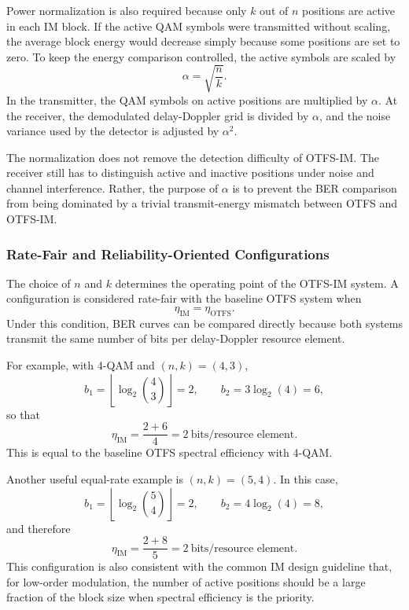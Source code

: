 Power normalization is also required because only \(k\) out of \(n\) positions are active in each IM block. If the active QAM symbols were transmitted without scaling, the average block energy would decrease simply because some positions are set to zero. To keep the energy comparison controlled, the active symbols are scaled by
\begin{equation}
    \alpha = \sqrt{\frac{n}{k}}.
    \label{eq:otfs_im_alpha}
\end{equation}
In the transmitter, the QAM symbols on active positions are multiplied by \(\alpha\). At the receiver, the demodulated delay-Doppler grid is divided by \(\alpha\), and the noise variance used by the detector is adjusted by \(\alpha^2\).

The normalization does not remove the detection difficulty of OTFS-IM. The receiver still has to distinguish active and inactive positions under noise and channel interference. Rather, the purpose of \(\alpha\) is to prevent the BER comparison from being dominated by a trivial transmit-energy mismatch between OTFS and OTFS-IM.

\subsubsection{Rate-Fair and Reliability-Oriented Configurations}

The choice of \(n\) and \(k\) determines the operating point of the OTFS-IM system. A configuration is considered rate-fair with the baseline OTFS system when
\begin{equation}
    \eta_{\mathrm{IM}} = \eta_{\mathrm{OTFS}}.
\end{equation}
Under this condition, BER curves can be compared directly because both systems transmit the same number of bits per delay-Doppler resource element.

For example, with 4-QAM and \((n,k)=(4,3)\),
\begin{equation}
    b_1 = \left\lfloor \log_2 \binom{4}{3} \right\rfloor = 2,
    \qquad
    b_2 = 3\log_2(4)=6,
\end{equation}
so that
\begin{equation}
    \eta_{\mathrm{IM}} = \frac{2+6}{4}=2
    \ \text{bits/resource element}.
\end{equation}
This is equal to the baseline OTFS spectral efficiency with 4-QAM.

Another useful equal-rate example is \((n,k)=(5,4)\). In this case,
\begin{equation}
    b_1 = \left\lfloor \log_2 \binom{5}{4} \right\rfloor = 2,
    \qquad
    b_2 = 4\log_2(4)=8,
\end{equation}
and therefore
\begin{equation}
    \eta_{\mathrm{IM}} = \frac{2+8}{5}=2
    \ \text{bits/resource element}.
\end{equation}
This configuration is also consistent with the common IM design guideline that, for low-order modulation, the number of active positions should be a large fraction of the block size when spectral efficiency is the priority.

